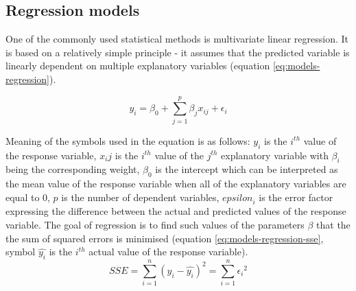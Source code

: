 \subsection{Regression models}
One of the commonly used statistical methods is multivariate linear regression. It is based on a relatively simple principle - it assumes that the predicted variable is linearly dependent on multiple explanatory variables (equation \ref{eq:models-regression}).

\begin{equation}\label{eq:models-regression}
    y_i = {\beta}_0 + \sum_{j = 1}^{p} {{\beta}_j x_{ij}} + {\epsilon}_i
\end{equation}

Meaning of the symbols used in the equation is as follows: $y_i$ is the $i^{th}$ value of the response variable, $x_ij$ is the $i^{th}$ value of the $j^{th}$ explanatory variable with ${\beta}_i$ being the corresponding weight, ${\beta}_0$ is the intercept which can be interpreted as the mean value of the response variable when all of the explanatory variables are equal to 0, $p$ is the number of dependent variables, ${epsilon}_i$ is the error factor expressing the difference between the actual and predicted values of the response variable. 
The goal of regression is to find such values of the parameters $\beta$ that the the sum of squared errors is minimised (equation \ref{eq:models-regression-sse}, symbol $\hat{y_i}$ is the $i^{th}$ actual value of the response variable).
\begin{equation}\label{eq:models-regression-sse}
    SSE = \sum_{i=1}^{n} {(y_i -  \hat{y_i})^2} = \sum_{i = 1}^{n} {{\epsilon}_i}^2
\end{equation}

